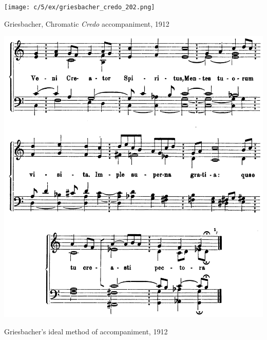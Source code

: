 \vspace*{\fill}

\newpage

\vspace*{\fill}

\begin{example}
  \centering
  \texttt{[image: c/5/ex/griesbacher\_credo\_202.png]}
  \caption{Griesbacher, Chromatic \emph{Credo} accompaniment, 1912}
  \label{mus:griesbacher_credo_202}
\end{example}

\vspace*{\fill}

\newpage

\vspace*{\fill}

\begin{example}
  \centering
  \includegraphics[width=.9\linewidth]{c/5/ex/griesbacher_ideal_88.png}
  \caption{Griesbacher's ideal method of accompaniment, 1912}
  \label{mus:griesbacher_ideal_88}
\end{example}

\vspace*{\fill}

\newpage

\vspace*{\fill}

